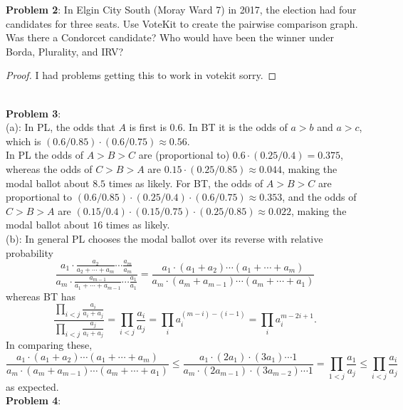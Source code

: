 \documentclass{amsart}
\begin{document}
	\textbf{Problem 2}: In Elgin City South (Moray Ward 7) in 2017, the election had four candidates for three seats. Use VoteKit to create the pairwise comparison graph. Was there a Condorcet candidate? Who would have been the winner under Borda, Plurality, and IRV?
	
	\begin{proof}
	I had problems getting this to work in votekit sorry.
	\end{proof}\\
	
	\textbf{Problem 3}:\\
	
	(a): In PL, the odds that $A$ is first is $0.6$. In BT it is the odds of $a>b$ and $a>c$, which is $(0.6/0.85) \cdot (0.6/0.75) \approx 0.56$.\\
	
	In PL the odds of $A>B>C$ are (proportional to) $0.6\cdot (0.25/0.4) = 0.375$, whereas the odds of $C>B>A$ are $0.15 \cdot (0.25/0.85) \approx 0.044$, making the modal ballot about $8.5$ times as likely. For BT, the odds of $A>B>C$ are proportional to $(0.6/0.85)\cdot (0.25/0.4)\cdot (0.6/0.75) \approx 0.353$, and the odds of $C>B>A$ are $(0.15/0.4)\cdot (0.15/0.75)\cdot (0.25/0.85) \approx 0.022 $, making the modal ballot about $16$ times as likely.\\
	
	(b): In general PL chooses the modal ballot over its reverse with relative probability
	$$
	\frac{a_1 \cdot \frac{a_2}{a_2+\cdots+a_m}\cdots \frac{a_m}{a_m}}{a_m \cdot \frac{a_{m-1}}{a_1+\cdots + a_{m-1}} \cdots \frac{a_1}{a_1}} = \frac{a_1\cdot (a_1+a_2)\cdots (a_1+\cdots+a_m)}{a_m \cdot (a_m+a_{m-1})\cdots (a_m+\cdots +a_1)}
	$$
	whereas BT has
	$$
	\frac{\prod_{i<j} \frac{a_i}{a_i+a_j}}{\prod_{i<j} \frac{a_j}{a_i+a_j}} = \prod_{i<j}\frac{a_i}{a_j} = \prod_{i} a_i^{(m-i) - (i-1)} = \prod_i a_i^{m-2i+1}.
	$$
	In comparing these,
	$$
	\frac{a_1\cdot (a_1+a_2)\cdots (a_1+\cdots+a_m)}{a_m \cdot (a_m+a_{m-1})\cdots (a_m+\cdots +a_1)} \leq \frac{a_1\cdot (2a_1)\cdot (3a_1)\cdots 1}{a_m\cdot (2a_{m-1}) \cdot (3a_{m-2})\cdots 1} = \prod_{1<j} \frac{a_1}{a_j} \leq \prod_{i<j}\frac{a_i}{a_j}
	$$
	as expected.\\
	
	\textbf{Problem 4}:\\
	
\end{document}
